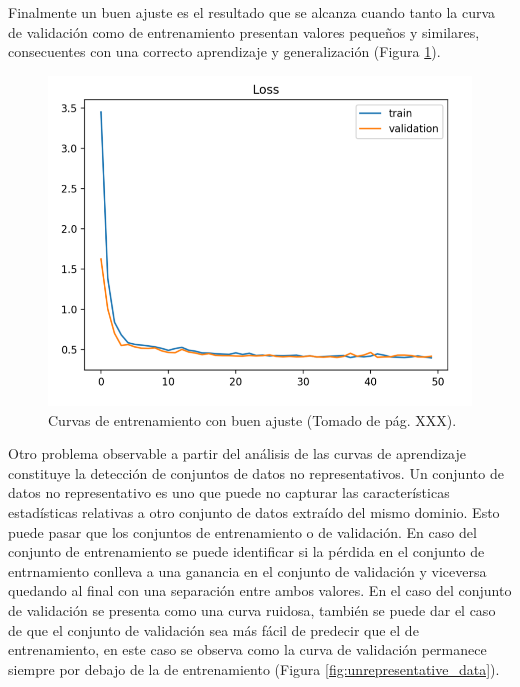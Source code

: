 Finalmente un buen ajuste es el resultado que se alcanza cuando tanto la curva de validación como de entrenamiento
presentan valores pequeños y similares, consecuentes con una correcto aprendizaje y generalización (Figura \ref{fig:good_fit}).

\begin{figure}[h!]
	\begin{center}
		\begin{center}
			\includegraphics[scale=.3]{Graphics/good_fit.png}
        \end{center}
	    \caption{Curvas de entrenamiento con buen ajuste (Tomado de \cite{brownlee2018better} pág. XXX).}\label{fig:good_fit}
	\end{center}
\end{figure}

Otro problema observable a partir del análisis de las curvas de aprendizaje constituye la detección de conjuntos
de datos no representativos. Un conjunto de datos no representativo es uno que puede no 
capturar las características estadísticas relativas a otro conjunto de datos extraído del mismo dominio.
Esto puede pasar que los conjuntos de entrenamiento o de validación. En caso del conjunto de entrenamiento
se puede identificar si la pérdida en el conjunto de entrnamiento conlleva a una ganancia en el conjunto de 
validación y viceversa quedando al final con una separación entre ambos valores. En el caso del conjunto de 
validación se presenta como una curva ruidosa, también se puede dar el caso de que el conjunto  de validación
sea más fácil de predecir que el de entrenamiento, en este caso se observa como la curva de validación permanece
siempre por debajo de la de entrenamiento (Figura \ref{fig:unrepresentative_data}).

